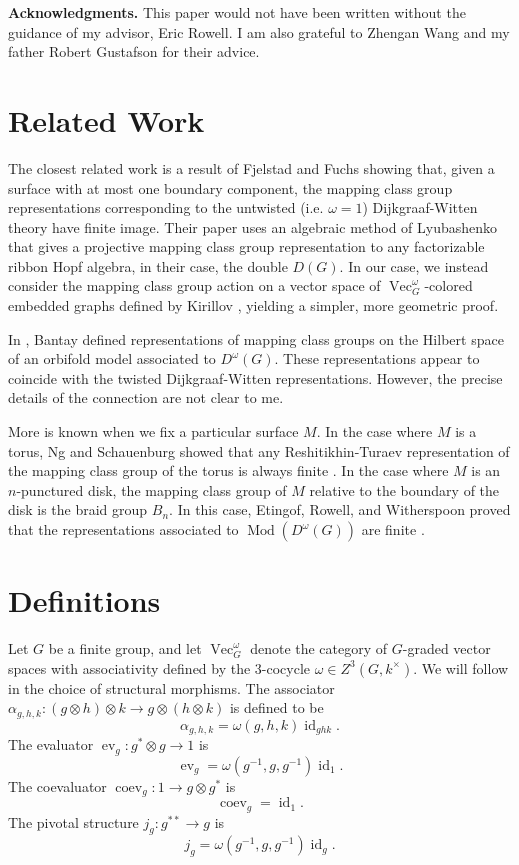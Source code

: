 \documentclass{amsart}
\DeclareMathOperator{\id}{id}
\DeclareMathOperator{\Mod}{Mod}
\DeclareMathOperator{\Vect}{Vec}
\DeclareMathOperator{\coev}{coev}
\DeclareMathOperator{\ev}{ev}
\begin{document}
\textbf{Acknowledgments.}  This paper would not have been written without the guidance of my advisor, Eric Rowell.  I am also grateful to Zhengan Wang and my father Robert Gustafson for their advice.

\section{Related Work}

The closest related work is a result of Fjelstad and Fuchs \cite{fjfu} showing that, given a surface with at most one boundary component, the mapping class group representations corresponding to the untwisted (i.e. $\omega = 1$) Dijkgraaf-Witten theory have finite image.  Their paper uses an algebraic method of Lyubashenko \cite{Lyubashenko1996} that gives a projective mapping class group representation to any factorizable ribbon Hopf algebra, in their case, the double $D(G)$. In our case, we instead consider the mapping class group action on a vector space of $\Vect_G^\omega$-colored embedded graphs defined by Kirillov \cite{kirillovStringNets}, yielding a simpler, more geometric proof.

In \cite{bantay}, Bantay defined representations of mapping class groups on the Hilbert space of an orbifold model associated to $D^\omega(G)$.  These representations appear to coincide with the twisted Dijkgraaf-Witten representations. However, the precise details of the connection are not clear to me.

More is known when we fix a particular surface $M$. In the case where $M$ is a torus, Ng and Schauenburg showed that any Reshitikhin-Turaev representation of the mapping class group of the torus is always finite \cite{0806.2493}.   In the case where $M$ is an $n$-punctured disk, the mapping class group of $M$ relative to the boundary of the disk is the braid group $B_n$.  In this case, Etingof, Rowell, and Witherspoon proved that the representations associated to $\Mod(D^\omega(G))$ are finite \cite{erw}.

\section{Definitions}

Let $G$ be a finite group, and let $\Vect_G^\omega$ denote the category of $G$-graded vector spaces with associativity defined by the  3-cocycle $\omega \in Z^3(G, k^\times)$.  We will follow \cite{math/0601012} in the choice of structural morphisms.  The associator $\alpha_{g,h,k}:(g \otimes h) \otimes k \to g \otimes (h \otimes k)$ is defined to be
$$\alpha_{g,h,k} = \omega(g,h,k) \id_{ghk}.$$ 
The evaluator $\ev_g:g^* \otimes g \to 1$ is 
$$\ev_g = \omega(g^{-1},g,g^{-1}) \id_1.$$  
The coevaluator $\coev_g:1 \to g \otimes g^*$ is 
$$\coev_g = \id_1.$$ 
The pivotal structure $j_g:g^{**} \to g$ is 
$$j_g = \omega(g^{-1},g,g^{-1}) \id_{g}.$$
\end{document}
